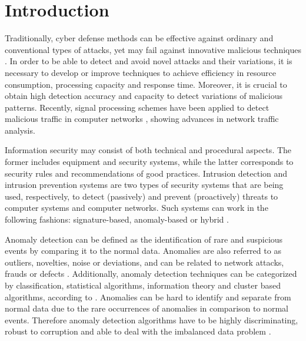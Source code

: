 \chapter{Introduction}
\label{ch:1_introduction}


Traditionally, cyber defense methods can be effective against ordinary and conventional types of attacks, yet may fail against innovative malicious techniques \cite{lakhina2005mining}. In order to be able to detect and avoid novel attacks and their variations, it is necessary to develop or improve techniques to achieve efficiency in resource consumption, processing capacity and response time. Moreover, it is crucial to obtain high detection accuracy and capacity to detect variations of malicious patterns. Recently, signal processing schemes have been applied to detect malicious traffic in computer networks \cite{Lu2009,Huang2009,Zonglin2009,david2011blind,da2012improved,tenorio2013greatest, vieira2017model}, showing advances in network traffic analysis.

Information security may consist of both technical and procedural aspects. The former includes equipment and security systems, while the latter corresponds to security rules and recommendations of good practices. Intrusion detection and intrusion prevention systems are two types of security systems that are being used, respectively, to detect (passively) and prevent (proactively) threats to computer systems and computer networks. Such systems can work in the following fashions: signature-based, anomaly-based or hybrid \cite{Huang2009,mudzingwa2012study}.

Anomaly detection can be defined as the identification of rare and suspicious events by comparing it to the normal data. Anomalies are also referred to as outliers, novelties, noise or deviations, and can be related to network attacks, frauds or defects \cite{bhuyan2014network,ahmed2016survey}. Additionally, anomaly detection techniques can be categorized by classification, statistical algorithms, information theory and cluster based algorithms, according to \cite{bhuyan2014network,ahmed2016survey,osanaiye2016distributed}. Anomalies can be hard to identify and separate from normal data due to the rare occurrences of anomalies in comparison to normal events. Therefore anomaly detection algorithms have to be highly discriminating, robust to corruption and able to deal with the imbalanced data problem \cite{he2008learning}.

